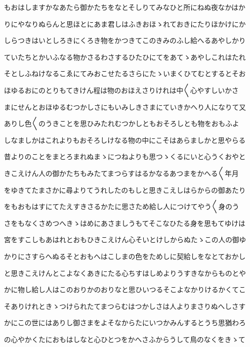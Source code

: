 \documentclass[a4paper,11pt,landscape]{ltjtarticle}
\begin{document}
\par\medskip
もおはしますかなあたら御かたちをなとそしりてみなひと所にねぬ夜なかはか
\par\medskip
りにやなりぬらんと思ほとにあま君しはふきおほゝれておきにたりほかけにか
\par\medskip
しらつきはいとしろきにくろき物をかつきてこのきみのふし給へるあやしかり
\par\medskip
ていたちとかいふなる物かさるわさするひたひにてをあてゝあやしこれはたれ
\par\medskip
そとしふねけなるこゑにてみおこせたるさらにたゝいまくひてむとするとそお
\par\medskip
ほゆるおにのとりもてきけん程は物のおほえさりけれは中〱心やすしいかさ
\par\medskip
まにせんとおほゆるむつかしさにもいみしきさまにていきかへり人になりて又
\par\medskip
ありし色〱のうきことを思ひみたれむつかしともおそろしとも物をおもふよ
\par\medskip
しなましかはこれよりもおそろしけなる物の中にこそはあらましかと思やらる
\par\medskip
昔よりのことをまとろまれぬまゝにつねよりも思つゝくるにいと心うくおやと
\par\medskip
きこえけん人の御かたちもみたてまつらすはるかなるあつまをかへる〱年月
\par\medskip
をゆきてたまさかに尋よりてうれしたのもしと思きこえしはらからの御あたり
\par\medskip
をもおもはすにてたえすきさるかたに思さため給し人につけてやう〱身のう
\par\medskip
さをもなくさめつへきゝはめにあさましうもてそこなひたる身を思もてゆけは
\par\medskip
宮をすこしもあはれとおもひきこえけん心そいとけしからぬたゝこの人の御ゆ
\par\medskip
かりにさすらへぬるそとおもへはこしまの色をためしに契給しをなとておかし
\par\medskip
と思きこえけんとこよなくあきにたる心ちすはしめよりうすきなからものとや
\par\medskip
かに物し給し人はこのおりかのおりなと思ひいつるそこよなかりけるかくてこ
\par\medskip
そありけれときゝつけられたてまつらむはつかしさは人よりまさりぬへしさす
\par\medskip
かにこの世にはありし御さまをよそなからたにいつかみんするとうち思猶わろ
\par\medskip
の心やかくたにおもはしなと心ひとつをかへさふからうして鳥のなくをきゝて
\par\medskip
\end{document}
